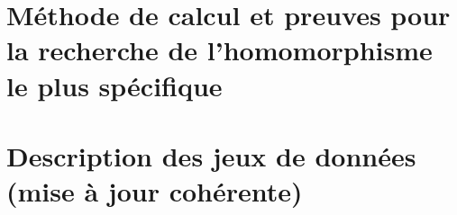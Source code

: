 ﻿\chapter{Méthode de calcul et preuves pour la recherche de l'homomorphisme le plus spécifique}
\label{appendice:most-specific}


\chapter{Description des jeux de données (mise à jour cohérente)}
\label{appendice:datasets}


% 
